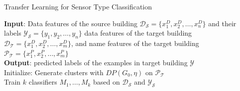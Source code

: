 \begin{algorithm}[ht]
 \caption{Transfer Learning for Sensor Type Classification}
 \label{algo}
 {\bf Input}: Data features of the source building $\mathcal{D_S}=\{x^D_1,x^D_2,\dots,x^D_n\}$ and their labels $\mathcal{Y_S}=\{y_1,y_2,\dots,y_n\}$  data features of the target building $\mathcal{D_T}=\{x^D_1,x^D_2,\dots,x^D_m\}$, and name features of the target building $\mathcal{P_T}=\{x^P_1,x^P_2,\dots,x^P_m\}$\\
 {\bf Output}: predicted labels of the examples in target building $\mathcal{Y}$\\
 Initialize: Generate clusters with $DP(G_{0}, \eta)$ on $\mathcal{P_T}$\\
 Train $k$ classifiers $M_1, \dots, M_k$ based on $\mathcal{D_S}$ and $\mathcal{Y_S}$\;

\end{algorithm}
